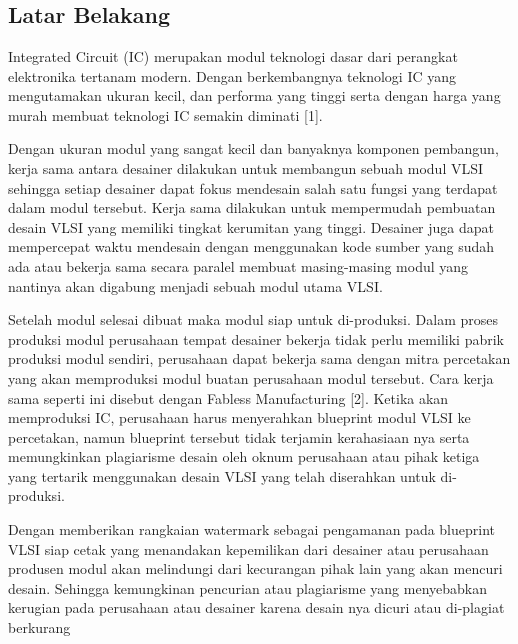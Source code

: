 \chapter{\babSatu}

\section{Latar Belakang}
Integrated Circuit (IC) merupakan modul teknologi dasar dari perangkat
elektronika tertanam modern. Dengan berkembangnya teknologi IC yang
mengutamakan ukuran kecil, dan performa yang tinggi serta dengan harga yang
murah membuat teknologi IC semakin diminati [1].

Dengan ukuran modul yang sangat kecil dan banyaknya komponen
pembangun, kerja sama antara desainer dilakukan untuk membangun sebuah
modul VLSI sehingga setiap desainer dapat fokus mendesain salah satu fungsi
yang terdapat dalam modul tersebut. Kerja sama dilakukan untuk mempermudah
pembuatan desain VLSI yang memiliki tingkat kerumitan yang tinggi. Desainer
juga dapat mempercepat waktu mendesain dengan menggunakan kode sumber
yang sudah ada atau bekerja sama secara paralel membuat masing-masing modul
yang nantinya akan digabung menjadi sebuah modul utama VLSI.

Setelah modul selesai dibuat maka modul siap untuk di-produksi. Dalam
proses produksi modul perusahaan tempat desainer bekerja tidak perlu memiliki
pabrik produksi modul sendiri, perusahaan dapat bekerja sama dengan mitra
percetakan yang akan memproduksi modul buatan perusahaan modul tersebut.
Cara kerja sama seperti ini disebut dengan Fabless Manufacturing [2]. Ketika
akan memproduksi IC, perusahaan harus menyerahkan blueprint modul VLSI ke
percetakan, namun blueprint tersebut tidak terjamin kerahasiaan nya serta
memungkinkan plagiarisme desain oleh oknum perusahaan atau pihak ketiga yang
tertarik menggunakan desain VLSI yang telah diserahkan untuk di-produksi.

Dengan memberikan rangkaian watermark sebagai pengamanan pada
blueprint VLSI siap cetak yang menandakan kepemilikan dari desainer atau
perusahaan produsen modul akan melindungi dari kecurangan pihak lain yang
akan mencuri desain. Sehingga kemungkinan pencurian atau plagiarisme yang
menyebabkan kerugian pada perusahaan atau desainer karena desain nya dicuri
atau di-plagiat berkurang


